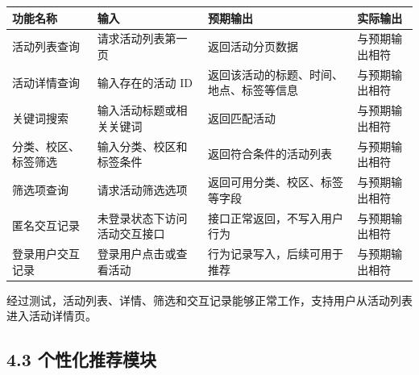 {\def\LTcaptype{none} %
\begin{longtable}[]{@{}|
  >{\raggedright\arraybackslash}p{}|
  >{\raggedright\arraybackslash}p{}|
  >{\raggedright\arraybackslash}p{}|
  >{\raggedright\arraybackslash}p{}|@{}}
\hline
\rowcolor{gray!12}
\begin{minipage}[b]{\linewidth}\raggedright
\bfseries 功能名称
\end{minipage} & \begin{minipage}[b]{\linewidth}\raggedright
\bfseries 输入
\end{minipage} & \begin{minipage}[b]{\linewidth}\raggedright
\bfseries 预期输出
\end{minipage} & \begin{minipage}[b]{\linewidth}\raggedright
\bfseries 实际输出
\end{minipage} \\
\hline
\endhead
\hline
\endlastfoot
活动列表查询 & 请求活动列表第一页 & 返回活动分页数据 & 与预期输出相符 \\
\hline
活动详情查询 & 输入存在的活动 ID &
返回该活动的标题、时间、地点、标签等信息 & 与预期输出相符 \\
\hline
关键词搜索 & 输入活动标题或相关关键词 & 返回匹配活动 & 与预期输出相符 \\
\hline
分类、校区、标签筛选 & 输入分类、校区和标签条件 & 返回符合条件的活动列表
& 与预期输出相符 \\
\hline
筛选项查询 & 请求活动筛选选项 & 返回可用分类、校区、标签等字段 &
与预期输出相符 \\
\hline
匿名交互记录 & 未登录状态下访问活动交互接口 &
接口正常返回，不写入用户行为 & 与预期输出相符 \\
\hline
登录用户交互记录 & 登录用户点击或查看活动 & 行为记录写入，后续可用于推荐
& 与预期输出相符 \\
\hline
\end{longtable}
}

经过测试，活动列表、详情、筛选和交互记录能够正常工作，支持用户从活动列表进入活动详情页。

\subsection{4.3
个性化推荐模块}\label{ux4e2aux6027ux5316ux63a8ux8350ux6a21ux5757}

